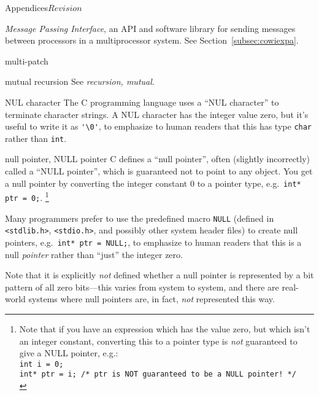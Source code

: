 \begin{cactuspart}{Appendices}{}{$Revision$}
\begin{Lentry}
  \textit{Message Passing Interface}, an API and software library for sending
  messages between processors in a multiprocessor system.
  See Section~\ref{subsec:cowiexpa}.
\item[multi-patch]
\item[mutual recursion]
  See \textit{recursion, mutual}.
\item[NUL character]
  The C programming language uses a ``NUL character'' to terminate
  character strings.  A NUL character has the integer value zero, but
  it's useful to write it as \verb|'\0'|, to emphasize to human readers
  that this has type \verb|char| rather than \verb|int|.
\item[null pointer, NULL pointer]
  C defines a ``null pointer'', often (slightly incorrectly) called
  a ``NULL pointer'', which is guaranteed not to point to any object.
  You get a null pointer by converting the integer constant 0 to a
  pointer type, e.g.\ \verb|int* ptr = 0;|.%
\footnote{%
       Note that if you have an expression which
       has the value zero, but which isn't an
       integer constant, converting this to a
       pointer type is \emph{not} guaranteed to
       give a NULL pointer, e.g.:\\
       {\tt int i = 0;}\\
       {\tt int* ptr = i;     /* ptr is NOT guaranteed to be a NULL pointer! */}\\
       }%

  Many programmers prefer to use the predefined macro \verb|NULL|
  (defined in \verb|<stdlib.h>|, \verb|<stdio.h>|, and possibly other
  system header files) to create null pointers,
  e.g.\ \verb|int* ptr = NULL;|, to emphasize to human readers that
  this is a null \emph{pointer} rather than ``just'' the integer zero.

  Note that it is explicitly \emph{not} defined whether a null pointer
  is represented by a bit pattern of all zero bits---this varies from
  system to system, and there are real-world systems where null pointers
  are, in fact, \emph{not} represented this way.


\end{Lentry}
\end{cactuspart}
